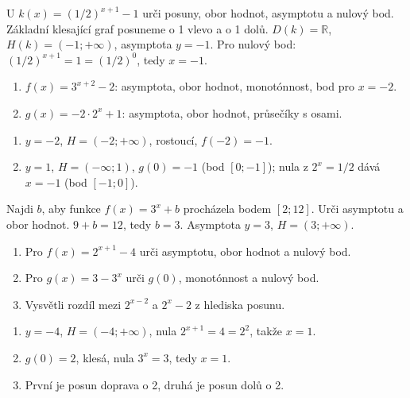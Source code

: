 \documentclass[11pt,a4paper]{article}
\begin{document}
\begin{prikladReseniBox}[title={Příklad 3}]
U $k(x)=(1/2)^{x+1}-1$ urči posuny, obor hodnot, asymptotu a nulový bod.
\tcblower
Základní klesající graf posuneme o 1 vlevo a o 1 dolů. $D(k)=\mathbb R$, $H(k)=(-1;+\infty)$, asymptota $y=-1$. Pro nulový bod: $(1/2)^{x+1}=1=(1/2)^0$, tedy $x=-1$.
\end{prikladReseniBox}
\begin{zadaniReseniBox}[title={Samostatná práce 1}]
\begin{enumerate}[label=\alph*)]
\item $f(x)=3^{x+2}-2$: asymptota, obor hodnot, monotónnost, bod pro $x=-2$.
\item $g(x)=-2\cdot2^x+1$: asymptota, obor hodnot, průsečíky s osami.
\end{enumerate}
\tcblower
\begin{enumerate}[label=\alph*)]
\item $y=-2$, $H=(-2;+\infty)$, rostoucí, $f(-2)=-1$.
\item $y=1$, $H=(-\infty;1)$, $g(0)=-1$ (bod $[0;-1]$); nula z $2^x=1/2$ dává $x=-1$ (bod $[-1;0]$).
\end{enumerate}
\end{zadaniReseniBox}
\begin{zadaniReseniBox}[title={Rozšíření 1}]
Najdi $b$, aby funkce $f(x)=3^x+b$ procházela bodem $[2;12]$. Urči asymptotu a obor hodnot.
\tcblower
$9+b=12$, tedy $b=3$. Asymptota $y=3$, $H=(3;+\infty)$.
\end{zadaniReseniBox}
\begin{zadaniReseniBox}[title={Domácí úkol}]
\begin{enumerate}[label=\alph*)]
\item Pro $f(x)=2^{x+1}-4$ urči asymptotu, obor hodnot a nulový bod.
\item Pro $g(x)=3-3^x$ urči $g(0)$, monotónnost a nulový bod.
\item Vysvětli rozdíl mezi $2^{x-2}$ a $2^x-2$ z hlediska posunu.
\end{enumerate}
\tcblower
\begin{enumerate}[label=\alph*)]
\item $y=-4$, $H=(-4;+\infty)$, nula $2^{x+1}=4=2^2$, takže $x=1$.
\item $g(0)=2$, klesá, nula $3^x=3$, tedy $x=1$.
\item První je posun doprava o 2, druhá je posun dolů o 2.
\end{enumerate}
\end{zadaniReseniBox}
\end{document}
